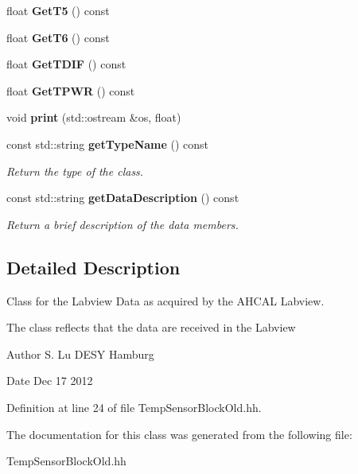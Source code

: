 \begin{DoxyCompactItemize}
\item 
float {\bfseries Get\-T5} () const \label{classCALICE_1_1TempSensorBlockOld_aa3e9bc414a3bb44caf97fcc815417790}

\item 
float {\bfseries Get\-T6} () const \label{classCALICE_1_1TempSensorBlockOld_af20c1b20fbd07c01f80ce2e9ad1ec03b}

\item 
float {\bfseries Get\-T\-D\-I\-F} () const \label{classCALICE_1_1TempSensorBlockOld_a5b6390ec23ce91e080f94188ecf2708f}

\item 
float {\bfseries Get\-T\-P\-W\-R} () const \label{classCALICE_1_1TempSensorBlockOld_a71713df3906fbd95f628d58d53c233f7}

\item 
void {\bfseries print} (std\-::ostream \&os, float)\label{classCALICE_1_1TempSensorBlockOld_afbe6d02c5fa6af5dedc8269ac47d3e53}

\item 
const std\-::string {\bf get\-Type\-Name} () const \label{classCALICE_1_1TempSensorBlockOld_aeeed0bef453e6e628add8cdc206febc0}

\begin{DoxyCompactList}\small\item\em Return the type of the class. \end{DoxyCompactList}\item 
const std\-::string {\bf get\-Data\-Description} () const \label{classCALICE_1_1TempSensorBlockOld_a1a0946cac03450c5f658780aee2c3ee6}

\begin{DoxyCompactList}\small\item\em Return a brief description of the data members. \end{DoxyCompactList}\end{DoxyCompactItemize}


\subsection{Detailed Description}
Class for the Labview Data as acquired by the A\-H\-C\-A\-L Labview. 

The class reflects that the data are received in the Labview \begin{DoxyAuthor}{Author}
S. Lu D\-E\-S\-Y Hamburg 
\end{DoxyAuthor}
\begin{DoxyDate}{Date}
Dec 17 2012 
\end{DoxyDate}


Definition at line 24 of file Temp\-Sensor\-Block\-Old.\-hh.



The documentation for this class was generated from the following file\-:\begin{DoxyCompactItemize}
\item 
Temp\-Sensor\-Block\-Old.\-hh\end{DoxyCompactItemize}
